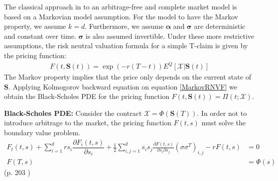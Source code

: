 The classical approach in \parencite{B-S-Paper} to an arbitrage-free and complete market model is based on a Markovian model assumption. For the model to have the Markov property, we assume $k=d$. Furthermore, we assume $\bm{\alpha}$ and $\bm{\sigma}$ are deterministic and constant over time. $\bm{\sigma}$ is also assumed invertible. Under these more restrictive assumptions, the risk neutral valuation formula for a simple T-claim is given by the pricing function:
\begin{align}\label{MarkovRNVF}
F(t,\bm{S}(t))=\exp(-r(T-t))E^Q[\mathcal{X}|\bm{S}(t)]
\end{align}
The Markov property implies that the price only depends on the current state of $\bm{S}$. Applying Kolmogorov backward equation on equation \eqref{MarkovRNVF} we obtain the Black-Scholes PDE for the pricing function $F(t,\bm{S}(t))=\Pi(t; \mathcal{X})$.

\begin{theorem}\label{BSPDEMultiDim}
\textbf{Black-Scholes PDE: } Consider the contract $\mathcal{X}=\Phi(\bm{S}(T))$. In order not to introduce arbitrage to the market, the pricing function $F(t,s)$ must solve the boundary value problem.
\begin{equation*}
\begin{split}
F_t(t,s)+\sum_{i=1}^{d} rs_i \dfrac{\partial F_i(t,s)}{\partial s_i}+\frac{1}{2} \sum_{i,j=1}^{d} s_is_j \frac{\partial F(t,s)}{\partial s_i \partial s_j} (\sigma \sigma^T)_{i,j} -rF(t,s)&=0\\
F(T,s)&=\Phi(s)
\end{split}
\end{equation*}
\null \hfill (p. 203 \parencite{finKont})
\end{theorem}


